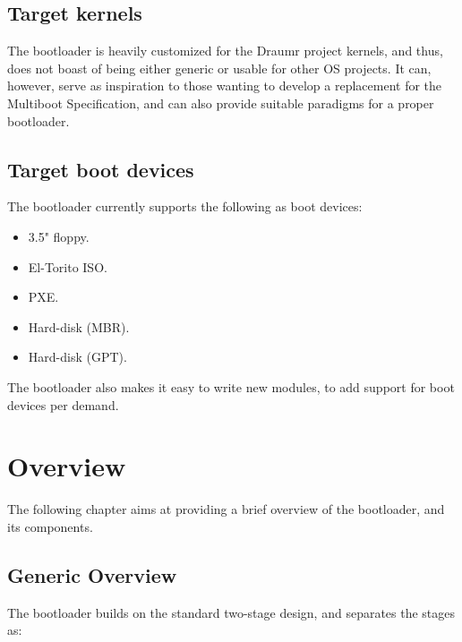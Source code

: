 \documentclass[a4paper,oneside]{memoir}
\begin{document}
\section{Target kernels}

The bootloader is heavily customized for the Draumr project kernels, and thus, does not boast of being either generic or usable for other OS projects. It can, however, serve as inspiration to those wanting to develop a replacement for the Multiboot Specification, and can also provide suitable paradigms for a proper bootloader.

\section{Target boot devices}

The bootloader currently supports the following as boot devices:

\begin{itemize}
    \item 3.5" floppy.
    \item El-Torito ISO.
    \item PXE.
    \item Hard-disk (MBR).
    \item Hard-disk (GPT).
\end{itemize}

The bootloader also makes it easy to write new modules, to add support for boot devices per demand.

\chapter{Overview}

The following chapter aims at providing a brief overview of the bootloader, and its components.

\section{Generic Overview}
\label{Generic Overview}

The bootloader builds on the standard two-stage design, and separates the stages as:
\end{document}

